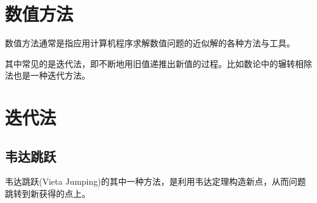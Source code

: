 
\section{数值方法}
\label{sec:numerical-method}

数值方法通常是指应用计算机程序求解数值问题的近似解的各种方法与工具。

其中常见的是迭代法，即不断地用旧值递推出新值的过程。比如数论中的辗转相除法也是一种迭代方法。

\section{迭代法}
\label{sec:iteration-method}

\subsection{韦达跳跃}
\label{sec:vieta-jumping}

韦达跳跃(Vieta Jumping)的其中一种方法，是利用韦达定理构造新点，从而问题跳转到新获得的点上。

